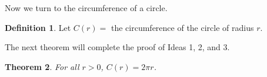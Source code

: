 \documentclass[twoside,twocolumn,12pt]{amsart}
\theoremstyle{plain}
\newtheorem{Theorem}{Theorem}
\newtheorem{Lemma}[Theorem]{Lemma}
\theoremstyle{definition}
\newtheorem{Definition}[Theorem]{Definition}
\begin{document}
Now we turn to the circumference of a circle.
\begin{Definition}
Let $C(r)= $ the circumference of the circle of radius $r$.
\end{Definition}

%
%
The next theorem will complete the proof of Ideas 1, 2, and 3.
%
\begin{Theorem}
 For all $r>0$, $C(r)=2\pi r$.
\end{Theorem}
\end{document}
